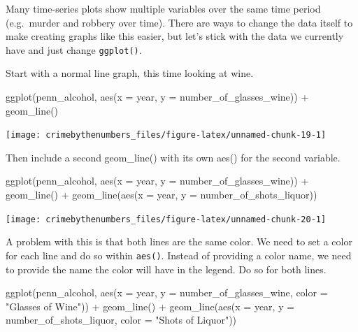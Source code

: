 \documentclass[
]{krantz}
\makeatletter
\newenvironment{Shaded}{\begin{snugshade}}{\end{snugshade}}
\newcommand{\AttributeTok}[1]{\textcolor[rgb]{0.61,0.61,0.61}{#1}}
\newcommand{\FunctionTok}[1]{\textcolor[rgb]{0,0,0}{#1}}
\newcommand{\NormalTok}[1]{#1}
\newcommand{\SpecialCharTok}[1]{\textcolor[rgb]{0,0,0}{#1}}
\newcommand{\StringTok}[1]{\textcolor[rgb]{0.5,0.5,0.5}{#1}}
\newenvironment{kframe}{%
\medskip{}
\setlength{\fboxsep}{.8em}
 \def\at@end@of@kframe{}%
 \ifinner\ifhmode%
  \def\at@end@of@kframe{\end{minipage}}%
  \begin{minipage}{\columnwidth}%
 \fi\fi%
 \def\FrameCommand##1{\hskip\@totalleftmargin \hskip-\fboxsep
 \colorbox{shadecolor}{##1}\hskip-\fboxsep
     \hskip-\linewidth \hskip-\@totalleftmargin \hskip\columnwidth}%
 \MakeFramed {\advance\hsize-\width
   \@totalleftmargin\z@ \linewidth\hsize
   \@setminipage}}%
 {\par\unskip\endMakeFramed%
 \at@end@of@kframe}
\renewenvironment{Shaded}{\begin{kframe}}{\end{kframe}}
\makeatother
\begin{document}
Many time-series plots show multiple variables over the same time period (e.g.~murder and robbery over time). There are ways to change the data itself to make creating graphs like this easier, but let's stick with the data we currently have and just change \texttt{ggplot()}.

Start with a normal line graph, this time looking at wine.

\begin{Shaded}
\begin{Highlighting}[]
\FunctionTok{ggplot}\NormalTok{(penn\_alcohol, }\FunctionTok{aes}\NormalTok{(}\AttributeTok{x =}\NormalTok{ year, }\AttributeTok{y =}\NormalTok{ number\_of\_glasses\_wine)) }\SpecialCharTok{+}
  \FunctionTok{geom\_line}\NormalTok{()}
\end{Highlighting}
\end{Shaded}

\begin{center}\texttt{[image: crimebythenumbers\_files/figure-latex/unnamed-chunk-19-1]} \end{center}

Then include a second geom\_line() with its own aes() for the second variable.

\begin{Shaded}
\begin{Highlighting}[]
\FunctionTok{ggplot}\NormalTok{(penn\_alcohol, }\FunctionTok{aes}\NormalTok{(}\AttributeTok{x =}\NormalTok{ year, }\AttributeTok{y =}\NormalTok{ number\_of\_glasses\_wine)) }\SpecialCharTok{+}
  \FunctionTok{geom\_line}\NormalTok{() }\SpecialCharTok{+} \FunctionTok{geom\_line}\NormalTok{(}\FunctionTok{aes}\NormalTok{(}\AttributeTok{x =}\NormalTok{ year, }\AttributeTok{y =}\NormalTok{ number\_of\_shots\_liquor))}
\end{Highlighting}
\end{Shaded}

\begin{center}\texttt{[image: crimebythenumbers\_files/figure-latex/unnamed-chunk-20-1]} \end{center}

A problem with this is that both lines are the same color. We need to set a color for each line and do so within \texttt{aes()}. Instead of providing a color name, we need to provide the name the color will have in the legend. Do so for both lines.

\begin{Shaded}
\begin{Highlighting}[]
\FunctionTok{ggplot}\NormalTok{(penn\_alcohol, }\FunctionTok{aes}\NormalTok{(}\AttributeTok{x =}\NormalTok{ year, }\AttributeTok{y =}\NormalTok{ number\_of\_glasses\_wine,}
  \AttributeTok{color =} \StringTok{"Glasses of Wine"}\NormalTok{)) }\SpecialCharTok{+} \FunctionTok{geom\_line}\NormalTok{() }\SpecialCharTok{+} \FunctionTok{geom\_line}\NormalTok{(}\FunctionTok{aes}\NormalTok{(}\AttributeTok{x =}\NormalTok{ year,}
  \AttributeTok{y =}\NormalTok{ number\_of\_shots\_liquor, }\AttributeTok{color =} \StringTok{"Shots of Liquor"}\NormalTok{))}
\end{Highlighting}
\end{Shaded}
\end{document}
